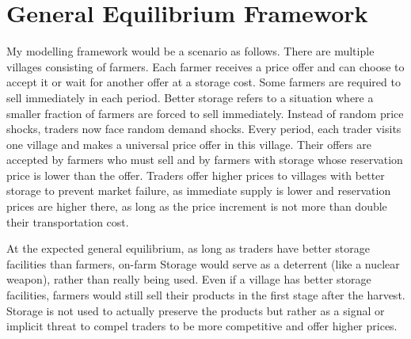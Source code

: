\newpage
\section{General Equilibrium Framework}
My modelling framework would be a scenario as follows. There are multiple villages consisting of farmers. Each farmer receives a price offer and can choose to accept it or wait for another offer at a storage cost. Some farmers are required to sell immediately in each period. Better storage refers to a situation where a smaller fraction of farmers are forced to sell immediately. Instead of random price shocks, traders now face random demand shocks. Every period, each trader visits one village and makes a universal price offer in this village. Their offers are accepted by farmers who must sell and by farmers with storage whose reservation price is lower than the offer. Traders offer higher prices to villages with better storage to prevent market failure, as immediate supply is lower and reservation prices are higher there, as long as the price increment is not more than double their transportation cost.

At the expected general equilibrium, as long as traders have better storage facilities than farmers, on-farm Storage would serve as a deterrent (like a nuclear weapon), rather than really being used. Even if a village has better storage facilities, farmers would still sell their products in the first stage after the harvest. Storage is not used to actually preserve the products but rather as a signal or implicit threat to compel traders to be more competitive and offer higher prices.
